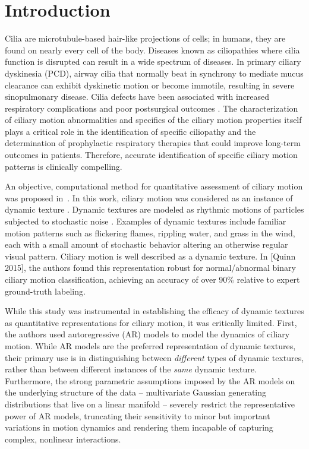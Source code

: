 \section{Introduction}

Cilia are microtubule-based hair-like projections of cells; in humans, they are found on nearly every cell of the body. Diseases known as ciliopathies where cilia function is disrupted can result in a wide spectrum of diseases. In primary ciliary dyskinesia (PCD), airway cilia that normally beat in synchrony to mediate mucus clearance can exhibit dyskinetic motion or become immotile, resulting in severe sinopulmonary disease\cite{o2007diagnosing}. Cilia defects have been associated with increased respiratory complications and poor postsurgical outcomes \cite{nakhleh2012high}. The characterization of ciliary motion abnormalities and specifics of the ciliary motion properties itself plays a critical role in the identification of specific ciliopathy and the determination of prophylactic respiratory therapies that could improve long-term outcomes in patients. Therefore, accurate identification of specific ciliary motion patterns is clinically compelling.

An objective, computational method for quantitative assessment of ciliary motion was proposed in~\cite{quinn2015automated}. In this work, ciliary motion was considered as an instance of dynamic texture \cite{saisan2001dynamic}. Dynamic textures are modeled as rhythmic motions of particles subjected to stochastic noise \cite{chen2013automatic}. Examples of dynamic textures include familiar motion patterns such as flickering flames, rippling water, and grass in the wind, each with a small amount of stochastic behavior altering an otherwise regular visual pattern. Ciliary motion is well described as a dynamic texture. In [Quinn 2015], the authors found this representation robust for normal/abnormal binary ciliary motion classification, achieving an accuracy of over 90\% relative to expert ground-truth labeling.

While this study was instrumental in establishing the efficacy of dynamic textures as quantitative representations for ciliary motion, it was critically limited. First, the authors used autoregressive (AR) models \cite{hyndman2007higher} to model the dynamics of ciliary motion. While AR models are the preferred representation of dynamic textures, their primary use is in distinguishing between \textit{different} types of dynamic textures, rather than between different instances of the \textit{same} dynamic texture. Furthermore, the strong parametric assumptions imposed by the AR models on the underlying structure of the data -- multivariate Gaussian generating distributions that live on a linear manifold -- severely restrict the representative power of AR models, truncating their sensitivity to minor but important variations in motion dynamics and rendering them incapable of capturing complex, nonlinear interactions.

